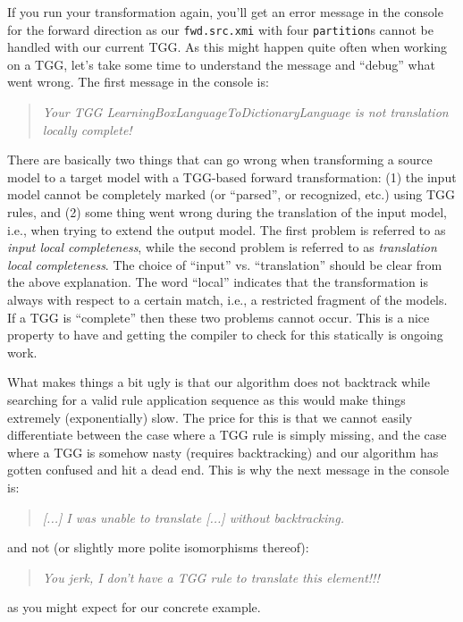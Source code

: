 If you run your transformation again, you'll get an error message in the console for the forward direction as our \texttt{fwd.src.xmi} with four \texttt{partition}s cannot be handled with our current TGG.
As this might happen quite often when working on a TGG, let's take some time to understand the message and ``debug'' what went wrong.
The first message in the console is:
\begin{quote}
  \emph{Your TGG LearningBoxLanguageToDictionaryLanguage is not translation locally complete!}
\end{quote}

There are basically two things that can go wrong when transforming a source model to a target model with a TGG-based forward transformation: (1) the input model cannot be completely marked (or ``parsed'', or recognized, etc.)  using TGG rules, and (2) some thing went wrong during the translation of the input model, i.e., when trying to extend the output model.
The first problem is referred to as \emph{input local completeness}, while the second problem is referred to as \emph{translation local completeness}.
The choice of ``input'' vs. ``translation'' should be clear from the above explanation.
The word ``local'' indicates that the transformation is always with respect to a certain match, i.e., a restricted fragment of the models.
If a TGG is ``complete'' then these two problems cannot occur.
This is a nice property to have and getting the compiler to check for this statically is ongoing work. 

What makes things a bit ugly is that our algorithm does not backtrack while searching for a valid rule application sequence as this would make things extremely (exponentially) slow.
The price for this is that we cannot easily differentiate between the case where a TGG rule is simply missing, and the case where a TGG is somehow nasty (requires backtracking) and our algorithm has gotten confused and hit a dead end.
This is why the next message in the console is:
\begin{quote}
\emph{[...] I was unable to translate [...] without backtracking.}
\end{quote}
and not (or slightly more polite isomorphisms thereof):
\begin{quote}
  \emph{You jerk, I don't have a TGG rule to translate this element!!!}
\end{quote}
as you might expect for our concrete example.

